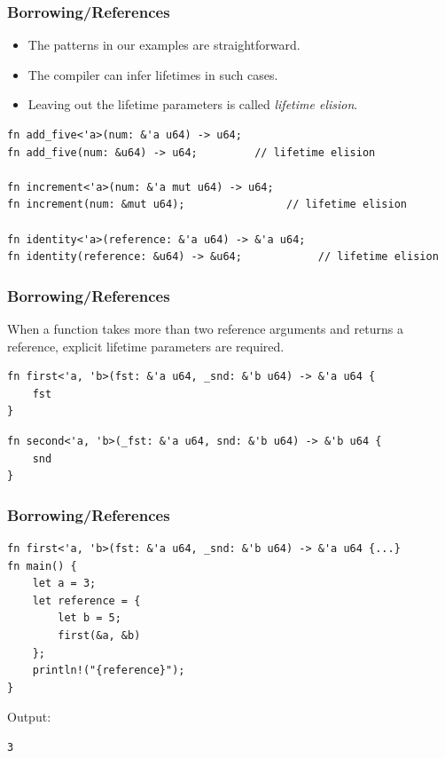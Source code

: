 \begin{frame}[fragile]
    \frametitle{Borrowing/References}
    \begin{itemize}
        \item The patterns in our examples are straightforward.
        \item The compiler can infer lifetimes in such cases.
        \item Leaving out the lifetime parameters is called \textit{lifetime elision}.
    \end{itemize}
    \pause
    \vfill
    \begin{verbatim}
fn add_five<'a>(num: &'a u64) -> u64;
fn add_five(num: &u64) -> u64;         // lifetime elision

fn increment<'a>(num: &'a mut u64) -> u64;
fn increment(num: &mut u64);                // lifetime elision

fn identity<'a>(reference: &'a u64) -> &'a u64;
fn identity(reference: &u64) -> &u64;            // lifetime elision
    \end{verbatim}
\end{frame}

\begin{frame}[fragile]
    \frametitle{Borrowing/References}
    When a function takes more than two reference arguments and returns a reference, explicit lifetime parameters are required.
    \pause
    \vfill
    \begin{verbatim}
fn first<'a, 'b>(fst: &'a u64, _snd: &'b u64) -> &'a u64 {
    fst
}
    \end{verbatim}
    \pause
    \vfill
    \begin{verbatim}
fn second<'a, 'b>(_fst: &'a u64, snd: &'b u64) -> &'b u64 {
    snd
}
    \end{verbatim}
\end{frame}

\begin{frame}[fragile]
    \frametitle{Borrowing/References}
    \begin{verbatim}
fn first<'a, 'b>(fst: &'a u64, _snd: &'b u64) -> &'a u64 {...}
fn main() {
    let a = 3;
    let reference = {
        let b = 5;
        first(&a, &b)
    };
    println!("{reference}");
}
    \end{verbatim}
    \vfill
    Output:
    \pause
    \begin{verbatim}
3
    \end{verbatim}
\end{frame}

